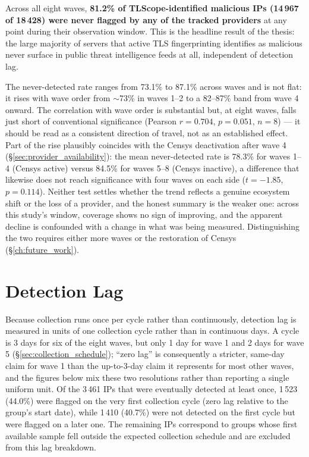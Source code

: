 \documentclass[12pt, a4paper, twoside]{report}
\begin{document}
Across all eight waves, \textbf{81.2\% of TLScope-identified malicious IPs (14\,967 of 18\,428)
were never flagged by any of the tracked providers} at any point during their observation window.
This is the headline result of the thesis: the large majority of servers that active TLS
fingerprinting identifies as malicious never surface in public threat intelligence feeds at all,
independent of detection lag.

The never-detected rate ranges from 73.1\% to 87.1\% across waves and is not flat: it rises with
wave order from $\sim$73\% in waves 1--2 to a 82--87\% band from wave 4 onward. The correlation
with wave order is substantial but, at eight waves, falls just short of conventional significance
(Pearson $r = 0.704$, $p = 0.051$, $n = 8$) --- it should be read as a consistent direction of
travel, not as an established effect. Part of the rise plausibly coincides with the Censys
deactivation after wave 4 (\S\ref{sec:provider_availability}): the mean never-detected rate is
78.3\% for waves 1--4 (Censys active) versus 84.5\% for waves 5--8 (Censys inactive), a difference
that likewise does not reach significance with four waves on each side ($t = -1.85$, $p = 0.114$).
Neither test settles whether the trend reflects a genuine ecosystem shift or the loss of a
provider, and the honest summary is the weaker one: across this study's window, coverage shows no
sign of improving, and the apparent decline is confounded with a change in what was being
measured. Distinguishing the two requires either more waves or the restoration of Censys
(\S\ref{ch:future_work}).

\section{Detection Lag}

Because collection runs once per cycle rather than continuously, detection lag is measured in units
of one collection cycle rather than in continuous days. A cycle is 3 days for six of the eight
waves, but only 1 day for wave 1 and 2 days for wave 5 (\S\ref{sec:collection_schedule}); ``zero
lag'' is consequently a stricter, same-day claim for wave 1 than the up-to-3-day claim it represents
for most other waves, and the figures below mix these two resolutions rather than reporting a
single uniform unit. Of the 3\,461 IPs that were eventually detected at least
once, 1\,523 (44.0\%) were flagged on the very first collection cycle (zero lag relative to the
group's start date), while 1\,410 (40.7\%) were not detected on the first cycle but were flagged on
a later one. The remaining IPs correspond to groups whose first available sample fell outside the
expected collection schedule and are excluded from this lag breakdown.
\end{document}
